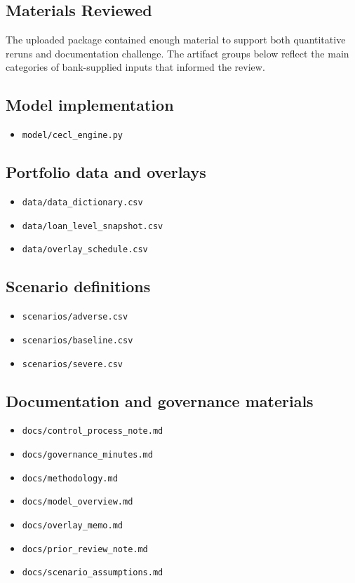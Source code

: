 \documentclass[11pt]{article}
\begin{document}
\subsection*{Materials Reviewed}
The uploaded package contained enough material to support both quantitative reruns and documentation challenge. The artifact groups below reflect the main categories of bank-supplied inputs that informed the review.
\subsection*{Model implementation}
\begin{itemize}
\item \texttt{model/cecl\_engine.py}
\end{itemize}
\subsection*{Portfolio data and overlays}
\begin{itemize}
\item \texttt{data/data\_dictionary.csv}
\item \texttt{data/loan\_level\_snapshot.csv}
\item \texttt{data/overlay\_schedule.csv}
\end{itemize}
\subsection*{Scenario definitions}
\begin{itemize}
\item \texttt{scenarios/adverse.csv}
\item \texttt{scenarios/baseline.csv}
\item \texttt{scenarios/severe.csv}
\end{itemize}
\subsection*{Documentation and governance materials}
\begin{itemize}
\item \texttt{docs/control\_process\_note.md}
\item \texttt{docs/governance\_minutes.md}
\item \texttt{docs/methodology.md}
\item \texttt{docs/model\_overview.md}
\item \texttt{docs/overlay\_memo.md}
\item \texttt{docs/prior\_review\_note.md}
\item \texttt{docs/scenario\_assumptions.md}
\end{itemize}
\end{document}
